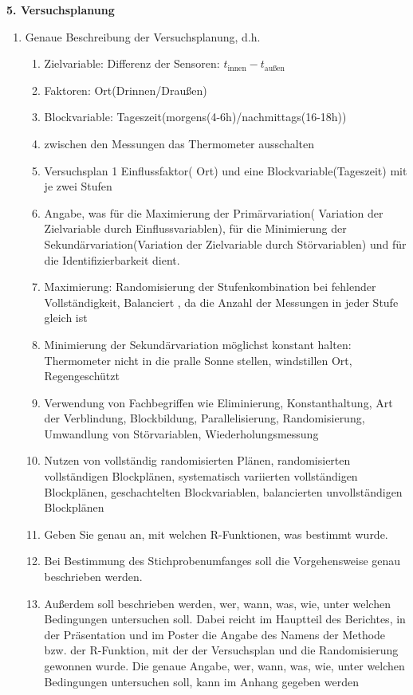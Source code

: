 \documentclass[ ngerman, fontsize= 12pt, paper=a4, headings=big, titlepage=true]{article}
\begin{document}
\textbf{5. Versuchsplanung}
\begin{enumerate}[-]
\item  Genaue Beschreibung der Versuchsplanung, d.h.
\begin{enumerate}[*]
	\item Zielvariable: Differenz der Sensoren: $t_{\text{innen}}-t_{\text{außen}}$
	\item Faktoren: Ort(Drinnen/Draußen)
	\item Blockvariable: Tageszeit(morgens(4-6h)/nachmittags(16-18h))
	\item zwischen den Messungen das Thermometer ausschalten
	\item Versuchsplan 1 Einflussfaktor( Ort) und eine Blockvariable(Tageszeit) mit je zwei Stufen
	\item Angabe, was für die Maximierung der Primärvariation( Variation der Zielvariable durch Einflussvariablen), für die Minimierung der
	Sekundärvariation(Variation der Zielvariable durch Störvariablen) und für die Identifizierbarkeit dient.
	\item Maximierung: Randomisierung der Stufenkombination bei fehlender Vollständigkeit, Balanciert , da die Anzahl der Messungen in jeder Stufe gleich ist
	\item Minimierung der Sekundärvariation möglichst konstant halten: Thermometer nicht in die pralle Sonne stellen, windstillen Ort, Regengeschützt
	
	\item Verwendung von Fachbegriffen wie Eliminierung, Konstanthaltung, Art der Verblindung, Blockbildung, Parallelisierung, Randomisierung, Umwandlung von Störvariablen, Wiederholungsmessung
	\item Nutzen von vollständig randomisierten Plänen, randomisierten vollständigen Blockplänen, systematisch variierten vollständigen Blockplänen, geschachtelten Blockvariablen, balancierten unvollständigen Blockplänen
	
	\item Geben Sie genau an, mit welchen R-Funktionen, was bestimmt wurde.
	\item Bei Bestimmung des Stichprobenumfanges soll die Vorgehensweise genau beschrieben
	werden. 
	
	
	\item Außerdem soll beschrieben werden, wer, wann, was, wie, unter welchen Bedingungen
	untersuchen soll. Dabei reicht im Hauptteil des Berichtes, in der Präsentation und
	im Poster die Angabe des Namens der Methode bzw. der R-Funktion, mit der
	der Versuchsplan und die Randomisierung gewonnen wurde. Die genaue Angabe,
	wer, wann, was, wie, unter welchen Bedingungen untersuchen soll, kann im Anhang
	gegeben werden
	
	

\end{enumerate}
\end{enumerate}
\end{document}
